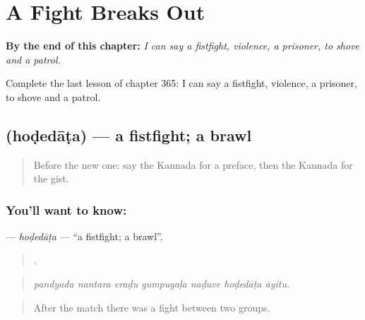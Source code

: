 
\chapter{A Fight Breaks Out}
\label{ch:ka-a-fight-breaks-out}

\begin{chapteropening}
\textbf{By the end of this chapter:} \emph{I can say a fistfight, violence, a prisoner, to shove and a patrol.}

Complete the last lesson of chapter 365: I can say a fistfight, violence, a prisoner, to shove and a patrol.
\end{chapteropening}

\section[\texorpdfstring{\kn{ಹೊಡೆದಾಟ} (hoḍedāṭa)}{ಹೊಡೆದಾಟ (hoḍedāṭa)}]{ (hoḍedāṭa) — a fistfight; a brawl}

\label{lesson:KA-C365-hodedata}



\begin{quote}
Before the new one: say the Kannada for a preface, then the Kannada for the gist.
\end{quote}

\subsection*{You'll want to know: }
\textbf{} — \emph{hoḍedāṭa} — \textquotedblleft{}a fistfight; a brawl\textquotedblright{}.

\begin{quote}
      .
\end{quote}

\begin{quote}
\emph{pandyada nantara eraḍu gumpugaḷa naḍuve hoḍedāṭa āyitu.}
\end{quote}

\begin{quote}
After the match there was a fight between two groups.
\end{quote}

